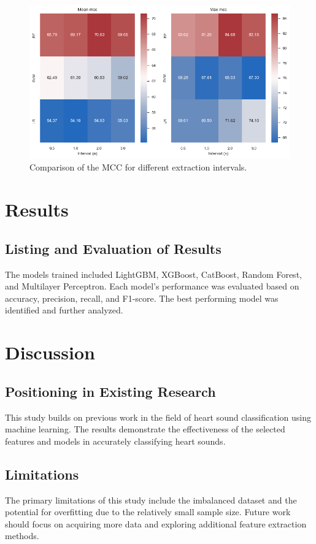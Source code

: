 \documentclass[twocolumn]{class}
\begin{document}
\begin{figure}[H]
    \centering
    \includegraphics[width=1\columnwidth]{./images/interval_impact_mcc.png}
    \caption{Comparison of the MCC for different extraction intervals.}
    \label{fig:interval_impact_mcc}
\end{figure}


\section{Results}
\subsection{Listing and Evaluation of Results}
The models trained included LightGBM, XGBoost, CatBoost, Random Forest, and Multilayer Perceptron. Each model's performance was evaluated based on accuracy, precision, recall, and F1-score. The best performing model was identified and further analyzed.

\section{Discussion}
\subsection{Positioning in Existing Research}
This study builds on previous work in the field of heart sound classification using machine learning. The results demonstrate the effectiveness of the selected features and models in accurately classifying heart sounds.

\subsection{Limitations}
The primary limitations of this study include the imbalanced dataset and the potential for overfitting due to the relatively small sample size. Future work should focus on acquiring more data and exploring additional feature extraction methods.
\end{document}
